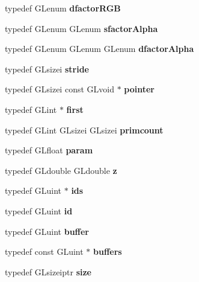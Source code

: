 \begin{DoxyCompactItemize}
\item 
typedef G\+Lenum {\bfseries dfactor\+R\+G\+B}\label{_s_d_l__opengl_8h_ace6fa1d73128e6b24233f54f0beac9cc}

\item 
typedef G\+Lenum G\+Lenum {\bfseries sfactor\+Alpha}\label{_s_d_l__opengl_8h_a147716336d55f4ee3ec628f7bec7a6b1}

\item 
typedef G\+Lenum G\+Lenum G\+Lenum {\bfseries dfactor\+Alpha}\label{_s_d_l__opengl_8h_a0529a4b173595ca2f8b5a42830266f10}

\item 
typedef G\+Lsizei {\bfseries stride}\label{_s_d_l__opengl_8h_adec60f1216ca1b900f8d776c5b6190e0}

\item 
typedef G\+Lsizei const G\+Lvoid $\ast$ {\bfseries pointer}\label{_s_d_l__opengl_8h_a809f16da56d1ff9e4ef4716f6aacaa91}

\item 
typedef G\+Lint $\ast$ {\bfseries first}\label{_s_d_l__opengl_8h_a970a385f6f880f2b620451db4ca4299a}

\item 
typedef G\+Lint G\+Lsizei G\+Lsizei {\bfseries primcount}\label{_s_d_l__opengl_8h_a286b5433e86a000955c14601a223e6d4}

\item 
typedef G\+Lfloat {\bfseries param}\label{_s_d_l__opengl_8h_ac7c896d55e93a6cf7ff8524005b4e7b4}

\item 
typedef G\+Ldouble G\+Ldouble {\bfseries z}\label{_s_d_l__opengl_8h_a5b27107fca91cf19a778530405575b37}

\item 
typedef G\+Luint $\ast$ {\bfseries ids}\label{_s_d_l__opengl_8h_a9d87e17a2e32dd2a7b881c7b1ca24a98}

\item 
typedef G\+Luint {\bfseries id}\label{_s_d_l__opengl_8h_a58c2a664503e14ffb8f21012aabff3e9}

\item 
typedef G\+Luint {\bfseries buffer}\label{_s_d_l__opengl_8h_ac4fdb15bdbcd63430bab668b5419ed9f}

\item 
typedef const G\+Luint $\ast$ {\bfseries buffers}\label{_s_d_l__opengl_8h_acaf3212fc88caa23745613e709a3e869}

\item 
typedef G\+Lsizeiptr {\bfseries size}\label{_s_d_l__opengl_8h_a3d1e3edfcf61ca2d831883e1afbad89e}


\end{DoxyCompactItemize}
